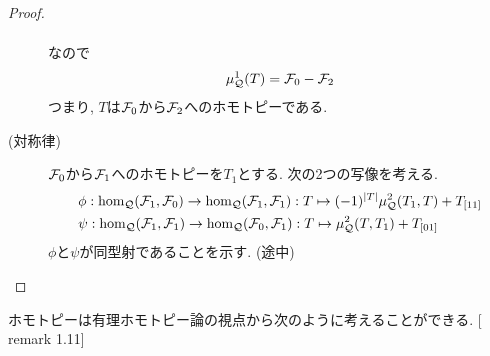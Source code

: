 \documentclass[uplatex, a4paper, 14Q, dvipdfmx]{jsarticle}
\begin{document}
\begin{proof}
\begin{description}
\begin{align*}
    \end{align*}
    なので
    \begin{align*}
      \mu^1_{\mathcal{Q}}(T)
      = \mathcal{F}_0 -\mathcal{F}_2
    \end{align*}
    つまり, $T$は$\mathcal{F}_0$から$\mathcal{F}_2$へのホモトピーである. 
    \item[(対称律)] $\mathcal{F}_0$から$\mathcal{F}_1$へのホモトピーを$T_1$とする. 
    次の2つの写像を考える. 
    \begin{align*}
      &\phi : \hom_{\mathcal{Q}}(\mathcal{F}_1,\mathcal{F}_0) \to \hom_{\mathcal{Q}}(\mathcal{F}_1,\mathcal{F}_1) : T \mapsto (-1)^{|T|} \mu^2_{\mathcal{Q}}(T_1,T) + T_{[11]} \\
      &\psi : \hom_{\mathcal{Q}}(\mathcal{F}_1,\mathcal{F}_1) \to \hom_{\mathcal{Q}}(\mathcal{F}_0,\mathcal{F}_1) : T \mapsto \mu^2_{\mathcal{Q}}(T,T_1) + T_{[01]}
    \end{align*}
    $\phi$と$\psi$が同型射であることを示す. (途中)
  \end{description}
\end{proof}

\begin{definition}
  
\end{definition}

ホモトピーは有理ホモトピー論の視点から次のように考えることができる. [\cite{Sei} remark 1.11]
\end{document}
